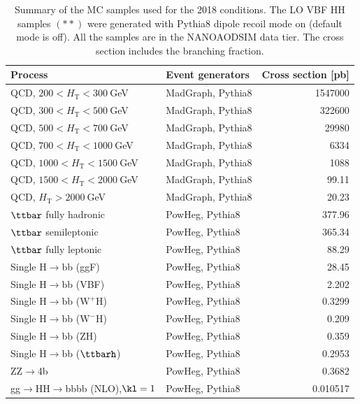 \begin{table}[htb]
\caption[Summary of the MC samples used for the 2018 conditions]{\label{samples:tab:MC2018}Summary of the MC samples used for the 2018 conditions. The LO VBF HH samples $(**)$ were generated with Pythia8 dipole recoil mode on (default mode is off). All the samples are in the NANOAODSIM data tier. The cross section includes the branching fraction.}
\begin{tabularx}{\textwidth}{lXr}
\hline
Process & Event generators & Cross section [pb]\\
\hline
QCD, $200  < H_\text{T} < 300~$GeV   & MadGraph, Pythia8   & 1547000  \\
QCD, $300  < H_\text{T} < 500~$GeV   & MadGraph, Pythia8   & 322600   \\
QCD, $500  < H_\text{T} < 700~$GeV   & MadGraph, Pythia8   & 29980    \\
QCD, $700  < H_\text{T} < 1000~$GeV  & MadGraph, Pythia8   & 6334     \\
QCD, $1000 < H_\text{T} < 1500~$GeV  & MadGraph, Pythia8   & 1088     \\
QCD, $1500 < H_\text{T} < 2000~$GeV  & MadGraph, Pythia8   & 99.11    \\
QCD, $H_\text{T} > 2000~$GeV         & MadGraph, Pythia8   & 20.23    \\
$\ttbar$ fully hadronic  & PowHeg, Pythia8                 & 377.96\\
$\ttbar$ semileptonic    & PowHeg, Pythia8                 & 365.34\\
$\ttbar$ fully leptonic  & PowHeg, Pythia8                 & 88.29\\
Single H$\to$bb  (ggF)                 & PowHeg, Pythia8      & 28.45 \\ 
Single H$\to$bb  (VBF)                 & PowHeg, Pythia8      & 2.202 \\
Single H$\to$bb  ($\mathrm{W^{+}H}$)   & PowHeg, Pythia8      & 0.3299\\ 
Single H$\to$bb  ($\mathrm{W^{-}H}$)   & PowHeg, Pythia8      & 0.209 \\ 
Single H$\to$bb  ($\mathrm{ZH}$)       & PowHeg, Pythia8      & 0.359 \\ 
Single H$\to$bb  ($\ttbarh$)           & PowHeg, Pythia8      & 0.2953\\ 
ZZ$\rightarrow$4b                   & PowHeg, Pythia8      & 0.3682\\ 
gg$\to$HH$\to$bbbb (NLO),$\kl=1$    & PowHeg, Pythia8      & 0.010517\\

\end{tabularx}
\end{table}
